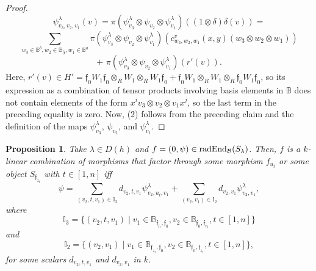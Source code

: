\documentclass{article}
\newtheorem{proposition}[theorem]{Proposition}
\theoremstyle{definition}
\newcommand{\End}{{ \rm End }}
\newcommand{\rad}{{ \rm rad }}
\renewcommand{\frak}{\mathfrak}
\newcommand{\hueca}[1]{\mathbb{#1}}
\begin{document}
\begin{proof}
\vbox{$$
\psi^\lambda_{v_3,v_2,v_1}(v)
=\pi (\psi^\lambda_{v_3}\otimes\psi_{v_2}\otimes\psi^\lambda_{v_1})((1\otimes\delta)\delta(v))=$$
$$
\sum_{w_3\in \hueca{B}^b,w_2\in \hueca{B}_{\frak{Z}},w_1\in \hueca{B}^a}\pi (\psi^\lambda_{v_3}\otimes\psi_{v_2}\otimes\psi^\lambda_{v_1})(c^v_{w_3,w_2,w_1}(x,y)(w_3\otimes w_2\otimes w_1))$$
$$+\,\,\pi (\psi^\lambda_{v_3}\otimes\psi_{v_2}\otimes\psi^\lambda_{v_1})(r'(v)).$$}
Here, $r'(v)\in H'=\frak{f}_0W_1\frak{f}_0\otimes_R W_1\otimes_RW_1\frak{f}_0+
\frak{f}_0W_1\otimes_RW_1\otimes_R\frak{f}_0W_1\frak{f}_0$, so its expression as a combination of  tensor products involving  basis  elements in $\hueca{B}$ does not contain elements of the form $x^iv_3\otimes v_2\otimes v_1x^j$, so the last term in the preceding equality is zero.  Now, (2) follows from the preceding claim and the definition of the maps $\psi^\lambda_{v_3}$, $\psi_{v_2}$, and $\psi^\lambda_{v_1}$.  
\end{proof}

\begin{proposition}\label{P: facts de un endomorf radical de Slambda}
Take $\lambda\in D(h)$ and $f=(0,\psi)\in \rad\End_{\cal B}(S_\lambda)$. Then, $f$ is a $k$-linear combination of morphisms that factor through some morphism $f_{u_t}$ or some object $S_{\frak{f}_{z_t}}$ with $t\in [1,n]$ iff 
$$\psi=\sum_{(v_2,t,v_1)\in \hueca{I}_3}
d_{v_2,t,v_1}\psi^\lambda_{v_2,u_t,v_1}
+
\sum_{(v_2,v_1)\in \hueca{I}_2}d_{v_2,v_1}\psi^\lambda_{v_2,v_1}, $$
where $$\hueca{I}_3=\{(v_2,t,v_1)\mid v_1\in \hueca{B}_{\frak{f}_{l_t},\frak{f}_0}, v_2\in \hueca{B}_{\frak{f}_0,\frak{f}_{r_t}},  t\in [1,n] \}$$ and 
$$\hueca{I}_2=\{(v_2,v_1)\mid 
v_1\in\hueca{B}_{\frak{f}_{z_t},\frak{f}_0}, v_2\in \hueca{B}_{\frak{f}_0,\frak{f}_{z_t}}, t\in [1,n]\},$$
for some scalars $d_{v_2,t,v_1}$ and $d_{v_2,v_1}$ in $k$.  
\end{proposition}
\end{document}
